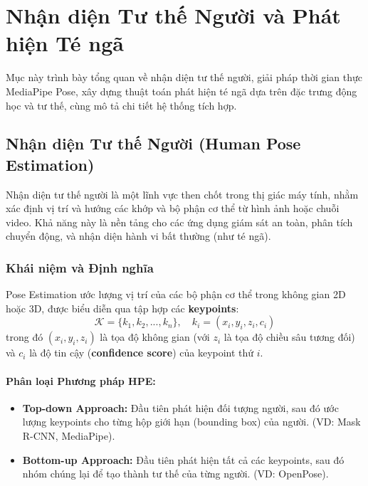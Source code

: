 \section{Nhận diện Tư thế Người và Phát hiện Té ngã}
\label{sec:pose_fall_system}

Mục này trình bày tổng quan về nhận diện tư thế người, giải pháp thời gian thực MediaPipe Pose, xây dựng thuật toán phát hiện té ngã dựa trên đặc trưng động học và tư thế, cùng mô tả chi tiết hệ thống tích hợp.

\subsection{Nhận diện Tư thế Người (Human Pose Estimation)}

Nhận diện tư thế người là một lĩnh vực then chốt trong thị giác máy tính, nhằm xác định vị trí và hướng các khớp và bộ phận cơ thể từ hình ảnh hoặc chuỗi video. Khả năng này là nền tảng cho các ứng dụng giám sát an toàn, phân tích chuyển động, và nhận diện hành vi bất thường (như té ngã).

\subsubsection{Khái niệm và Định nghĩa}

Pose Estimation ước lượng vị trí của các bộ phận cơ thể trong không gian 2D hoặc 3D, được biểu diễn qua tập hợp các \textbf{keypoints}:
\begin{equation}
\mathcal{K} = \{k_1, k_2, ..., k_n\}, \quad k_i = (x_i, y_i, z_i, c_i)
\end{equation}
trong đó $(x_i, y_i, z_i)$ là tọa độ không gian (với $z_i$ là tọa độ chiều sâu tương đối) và $c_i$ là độ tin cậy (\textbf{confidence score}) của keypoint thứ $i$.

\paragraph{Phân loại Phương pháp HPE:}
\begin{itemize}
    \item \textbf{Top-down Approach:} Đầu tiên phát hiện đối tượng người, sau đó ước lượng keypoints cho từng hộp giới hạn (bounding box) của người. (VD: Mask R-CNN, MediaPipe).
    \item \textbf{Bottom-up Approach:} Đầu tiên phát hiện tất cả các keypoints, sau đó nhóm chúng lại để tạo thành tư thế của từng người. (VD: OpenPose).
\end{itemize}

